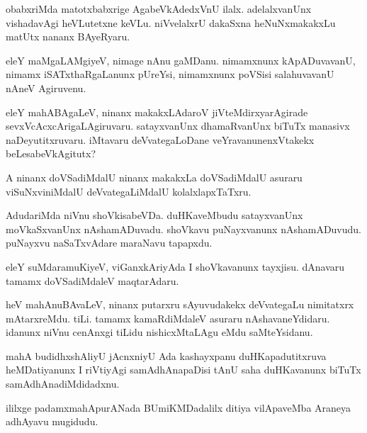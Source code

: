 \documentclass{article}
\begin{document}
\begin{mn}
obabxriMda matotxbabxrige AgabeVkAdedxVnU ilalx. adelalxvanUnx vishadavAgi 
heVLutetxne keVLu.  niVvelalxrU dakaSxna heNuNxmakakxLu matUtx nananx BAyeRyaru.
\end{mn}

\begin{mn}
eleY maMgaLAMgiyeV, nimage nAnu gaMDanu. nimamxnunx kApADuvavanU, nimamx 
 iSATxthaRgaLanunx  pUreYsi, nimamxnunx poVSisi salahuvavanU nAneV Agiruvenu.
\end{mn}

\begin{mn}
eleY mahABAgaLeV, ninanx makakxLAdaroV jiVteMdirxyarAgirade  
sevxVcAcxcArigaLAgiruvaru. satayxvanUnx dhamaRvanUnx biTuTx manasivx 
 naDeyutitxruvaru. iMtavaru deVvategaLoDane veYravanunenxVtakekx beLesabeVkAgitutx?
\end{mn}

\begin{mn}
A ninanx doVSadiMdalU ninanx makakxLa doVSadiMdalU asuraru viSuNxviniMdalU 
deVvategaLiMdalU kolalxlapxTaTxru.
\end{mn}

\begin{mn}
AdudariMda niVnu shoVkisabeVDa. duHKaveMbudu satayxvanUnx moVkaSxvanUnx 
nAshamADuvadu. shoVkavu puNayxvanunx nAshamADuvudu. puNayxvu naSaTxvAdare 
maraNavu tapapxdu.
\end{mn}

\begin{mn}
eleY suMdaramuKiyeV, viGanxkAriyAda I shoVkavanunx tayxjisu.
 dAnavaru tamamx doVSadiMdaleV maqtarAdaru.
\end{mn}

\begin{mn}
heV mahAnuBAvaLeV, ninanx putarxru sAyuvudakekx deVvategaLu nimitatxrx 
mAtarxreMdu. tiLi.  tamamx kamaRdiMdaleV asuraru  nAshavaneYdidaru. idanunx 
niVnu cenAnxgi tiLidu nishicxMtaLAgu eMdu saMteYsidanu. 
\end{mn}

\begin{mn}
mahA budidhxshAliyU jAcnxniyU Ada kashayxpanu duHKapadutitxruva heMDatiyanunx 
I riVtiyAgi samAdhAnapaDisi tAnU saha duHKavanunx biTuTx samAdhAnadiMdidadxnu.
\end{mn}

\begin{mn}
ililxge padamxmahApurANada BUmiKMDadalilx ditiya vilApaveMba Araneya adhAyavu mugidudu.
\end{mn}
\end{document}
